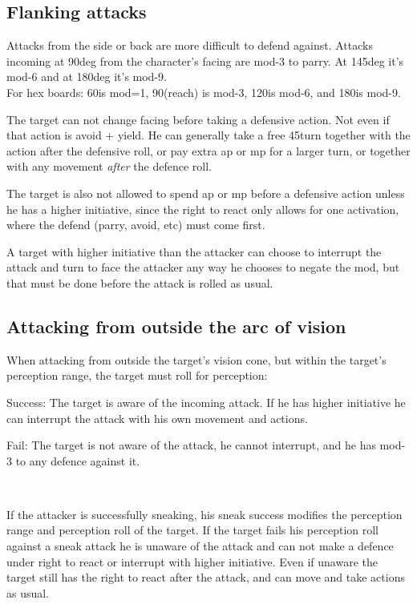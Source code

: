 \subsection*{Flanking attacks}
Attacks from the side or back are more difficult to defend against. Attacks incoming at 90deg from the character's facing are mod-3 to parry. At 145deg it's mod-6 and at 180deg it's mod-9.\\
For hex boards: 60\degrees is mod=1, 90\degrees (reach) is mod-3, 120\degrees is mod-6, and 180\degrees is mod-9.

The target can not change facing before taking a defensive action. Not even if that action is avoid + yield. He can generally take a free 45\degrees turn together with the action after the defensive roll, or pay extra ap or mp for a larger turn, or together with any movement \emph{after} the defence roll.

The target is also not allowed to spend ap or mp before a defensive action unless he has a higher initiative, since the right to react only allows for one activation, where the defend (parry, avoid, etc) must come first.

A target with higher initiative than the attacker can choose to interrupt the attack and turn to face the attacker any way he chooses to negate the mod, but that must be done before the attack is rolled as usual.


\subsection*{Attacking from outside the arc of vision}
When attacking from outside the target's vision cone, but within the target's perception range, the target must roll for perception:

\noindent Success: The target is aware of the incoming attack. If he has higher initiative he can interrupt the attack with his own movement and actions.

\noindent Fail: The target is not aware of the attack, he cannot interrupt, and he has mod-3 to any defence against it.

\

If the attacker is successfully sneaking, his sneak success modifies the perception range and perception roll of the target. If the target fails his perception roll against a sneak attack he is unaware of the attack and can not make a defence under right to react or interrupt with higher initiative. Even if unaware the target still has the right to react after the attack, and can move and take actions as usual.


